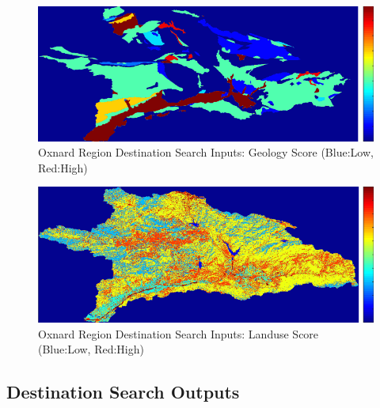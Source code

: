         \begin{figure}[!h]
            \begin{center}
            \includegraphics[width=5.5in]{figures/Oxnard_Search_Geology.png}   
            \caption{Oxnard Region Destination Search Inputs: Geology Score (Blue:Low, Red:High)}
            \label{fig:Odsinputs_geology}
            \end{center}
        \end{figure}
    
        \begin{figure}[!h]
            \begin{center}
            \includegraphics[width=5.5in]{figures/Oxnard_Search_Landuse.png}   
            \caption{Oxnard Region Destination Search Inputs: Landuse Score (Blue:Low, Red:High)}
            \label{fig:Odsinputs_landuse}
            \end{center}
        \end{figure}
    
    \subsection{Destination Search Outputs}
    
